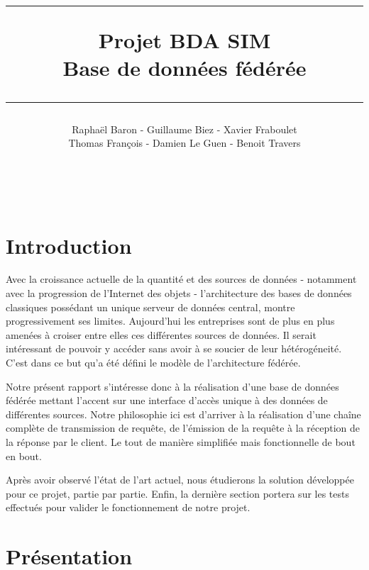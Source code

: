 \documentclass[a4paper,10pt]{article}
\title{\hrule \bigskip Projet BDA SIM \\ Base de données fédérée \bigskip \hrule}
\author{Raphaël Baron - Guillaume Biez - Xavier Fraboulet \\ Thomas François - Damien Le Guen - Benoit Travers}
\begin{document}
\maketitle
\thispagestyle{empty}
\newpage

~~\\
\thispagestyle{empty}
\newpage

\tableofcontents

\newpage
\section{Introduction}
Avec la croissance actuelle de la quantité et des sources de données - notamment avec la progression de l'Internet des objets - l'architecture des bases de données classiques possédant un unique serveur de données central, montre progressivement ses limites. Aujourd'hui les entreprises sont de plus en plus amenées à croiser entre elles ces différentes sources de données. Il serait intéressant de pouvoir y accéder sans avoir à se soucier de leur hétérogéneité. C'est dans ce but qu'a été défini le modèle de l'architecture fédérée.

Notre présent rapport s'intéresse donc à la réalisation d'une base de données fédérée mettant l'accent sur une interface d'accès unique à des données de différentes sources. Notre philosophie ici est d'arriver à la réalisation d'une chaîne complète de transmission de requête, de l'émission de la requête à la réception de la réponse par le client. Le tout de manière simplifiée mais fonctionnelle de bout en bout.

Après avoir observé l'état de l'art actuel, nous étudierons la solution développée pour ce projet, partie par partie. Enfin, la dernière section portera sur les tests effectués pour valider le fonctionnement de notre projet.





\newpage
\section{Présentation}
\end{document}
